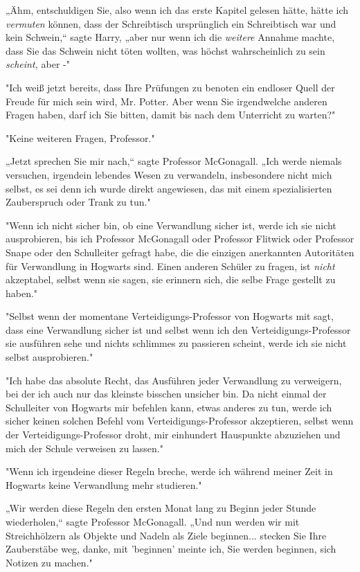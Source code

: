 {„Ähm, entschuldigen Sie, also wenn ich das erste Kapitel gelesen hätte, hätte ich \emph{vermuten} können, dass der Schreibtisch ursprünglich ein Schreibtisch war und kein Schwein,“ sagte Harry, „aber nur wenn ich die \emph{weitere} Annahme machte, dass Sie das Schwein nicht töten wollten, was höchst wahrscheinlich zu sein \emph{scheint,} aber -"

"Ich weiß jetzt bereits, dass Ihre Prüfungen zu benoten ein endloser Quell der Freude für mich sein wird, Mr. Potter. Aber wenn Sie irgendwelche anderen Fragen haben, darf ich Sie bitten, damit bis nach dem Unterricht zu warten?"

"Keine weiteren Fragen, Professor."

„Jetzt sprechen Sie mir nach,“ sagte Professor McGonagall. „Ich werde niemals versuchen, irgendein lebendes Wesen zu verwandeln, insbesondere nicht mich selbst, es sei denn ich wurde direkt angewiesen, das mit einem spezialisierten Zauberspruch oder Trank zu tun."

"Wenn ich nicht sicher bin, ob eine Verwandlung sicher ist, werde ich sie nicht ausprobieren, bis ich Professor McGonagall oder Professor Flitwick oder Professor Snape oder den Schulleiter gefragt habe, die die einzigen anerkannten Autoritäten für Verwandlung in Hogwarts sind. Einen anderen Schüler zu fragen, ist \emph{nicht} akzeptabel, selbst wenn sie sagen, sie erinnern sich, die selbe Frage gestellt zu haben."

"Selbst wenn der momentane Verteidigungs-Professor von Hogwarts mit sagt, dass eine Verwandlung sicher ist und selbst wenn ich den Verteidigungs-Professor sie ausführen sehe und nichts schlimmes zu passieren scheint, werde ich sie nicht selbst ausprobieren."

"Ich habe das absolute Recht, das Ausführen jeder Verwandlung zu verweigern, bei der ich auch nur das kleinste bisschen unsicher bin. Da nicht einmal der Schulleiter von Hogwarts mir befehlen kann, etwas anderes zu tun, werde ich sicher keinen solchen Befehl vom Verteidigungs-Professor akzeptieren, selbst wenn der Verteidigungs-Professor droht, mir einhundert Hauspunkte abzuziehen und mich der Schule verweisen zu lassen."

"Wenn ich irgendeine dieser Regeln breche, werde ich während meiner Zeit in Hogwarts keine Verwandlung mehr studieren."

„Wir werden diese Regeln den ersten Monat lang zu Beginn jeder Stunde wiederholen,“ sagte Professor McGonagall. „Und nun werden wir mit Streichhölzern als Objekte und Nadeln als Ziele beginnen... stecken Sie Ihre Zauberstäbe weg, danke, mit 'beginnen' meinte ich, Sie werden beginnen, sich Notizen zu machen."

}
